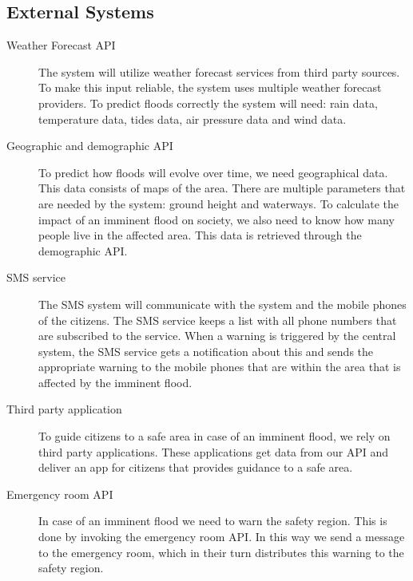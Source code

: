\subsection{External Systems}
\begin{description}
	\item[Weather Forecast API] The system will utilize weather forecast services from third party sources. To make this input reliable, the system uses multiple weather forecast providers. To predict floods correctly the system will need: rain data, temperature data, tides data, air pressure data and wind data.
	\item[Geographic and demographic API] To predict how floods will evolve over time, we need geographical data. This data consists of maps of the area. There are multiple parameters that are needed by the system: ground height and waterways. To calculate the impact of an imminent flood on society, we also need to know how many people live in the affected area. This data is retrieved through the demographic API.
	\item[SMS service] The SMS system will communicate with the system and the mobile phones of the citizens. The SMS service keeps a list with all phone numbers that are subscribed to the service. When a warning is triggered by the central system, the SMS service gets a notification about this and sends the appropriate warning to the mobile phones that are within the area that is affected by the imminent flood.
	\item[Third party application] To guide citizens to a safe area in case of an imminent flood, we rely on third party applications. These applications get data from our API and deliver an app for citizens that provides guidance to a safe area.
	\item[Emergency room API] In case of an imminent flood we need to warn the safety region. This is done by invoking the emergency room API. In this way we send a message to the emergency room, which in their turn distributes this warning to the safety region.
\end{description}

